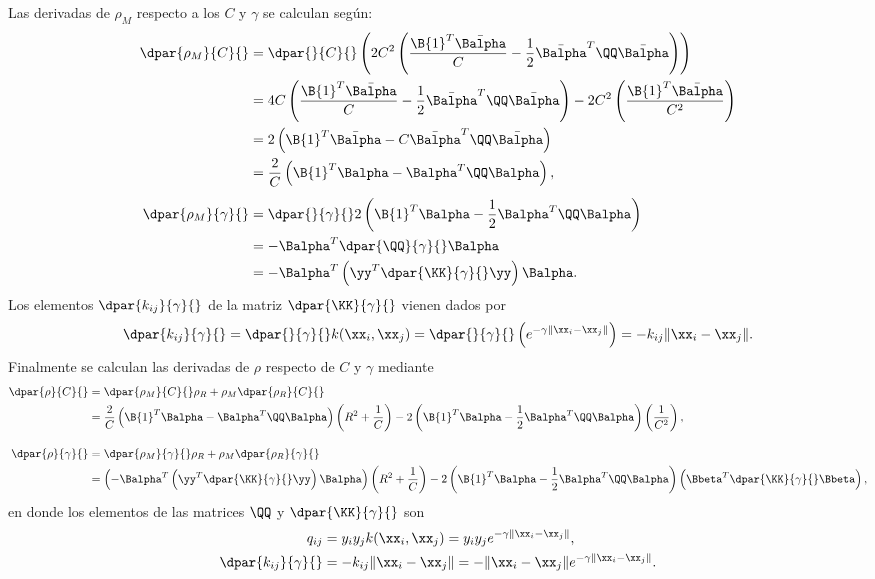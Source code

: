 Las derivadas de $\rho_M$ respecto a los  $C$ y $\gamma$ se
calculan según:
%
\begin{align}
    \dpar{\rho_M}{C}{}
    &= \dpar{}{C}{}\left( 2C^2\left(\frac{\B{1}^T\bar{\Balpha}}{C} -
    \frac{1}{2}\bar{\Balpha}^T\QQ\bar{\Balpha}\right)
    \right) \nonumber\\
    &= 4C \left(\frac{\B{1}^T\bar{\Balpha}}{C} -
    \frac{1}{2}\bar{\Balpha}^T\QQ\bar{\Balpha}\right)
    - 2C^2 \left(\frac{\B{1}^T\bar{\Balpha}}{C^2} \right) \nonumber\\
    &= 2\left(\B{1}^T\bar{\Balpha}
    - C \bar{\Balpha}^T\QQ\bar{\Balpha}\right) \nonumber\\
    &= \frac{2}{C} \left(\B{1}^T\Balpha - \Balpha^T\QQ\Balpha\right),\\[1ex]
    \dpar{\rho_M}{\gamma}{}
    &= \dpar{}{\gamma}{}
    2\left(  \B{1}^T\Balpha-\frac{1}{2}\Balpha^T\QQ\Balpha \right) \nonumber\\
    &= - \Balpha^T \dpar{\QQ}{\gamma}{}\Balpha \nonumber\\
    & = - \Balpha^T \left(\yy^T \dpar{\KK}{\gamma}{}\yy\right) \Balpha.
\end{align}
%
Los elementos $\dpar{k_{ij}}{\gamma}{}$ de la matriz
$\dpar{\KK}{\gamma}{}$ vienen dados por
%
\begin{align}
  \dpar{k_{ij}}{\gamma}{}
  = \dpar{}{\gamma}{}k(\xx_i,\xx_j)
  = \dpar{}{\gamma}{} \left(e^{-\gamma\|\xx_i-\xx_j\|}\right)
  = -k_{ij}\|\xx_i-\xx_j\|.
\end{align}
%
Finalmente se calculan las derivadas de $\rho$ respecto de $C$ y
$\gamma$ mediante
%
\begin{align}
    \dpar{\rho}{C}{} &= \dpar{\rho_M}{C}{} \rho_R + \rho_M \dpar{\rho_R}{C}{} \nonumber\\
    &= \frac{2}{C} \left(\B{1}^T\Balpha - \Balpha^T\QQ\Balpha\right) \left( R^2 + \frac{1}{C} \right)
    - 2\left(  \B{1}^T\Balpha-\frac{1}{2}\Balpha^T\QQ\Balpha \right)
    \left( \frac{1}{C^2} \right) \label{drho-dc}, \\[1em]
    \dpar{\rho}{\gamma}{} &= \dpar{\rho_M}{\gamma}{} \rho_R + \rho_M \dpar{\rho_R}{\gamma}{}\nonumber\\
    &= \left( - \Balpha^T \left(\yy^T \dpar{\KK}{\gamma}{}\yy\right) \Balpha \right)
    \left( R^2 + \frac{1}{C} \right)
    - 2\left(  \B{1}^T\Balpha-\frac{1}{2}\Balpha^T\QQ\Balpha \right)
    \left( \Bbeta^T \dpar{\KK}{\gamma}{} \Bbeta \right), \label{drho-dgamma}
\end{align}
%
en donde los elementos de las matrices $\QQ$ y $\dpar{\KK}{\gamma}{}$
son
%
\begin{align}
  q_{ij}&=y_i y_j k(\xx_i,\xx_j)= y_i y_j e^{-\gamma\|\xx_i-\xx_j\|}, \\
  \dpar{k_{ij}}{\gamma}{}&=-k_{ij}\|\xx_i-\xx_j\| = -\|\xx_i-\xx_j\|e^{-\gamma\|\xx_i-\xx_j\|}.
\end{align}
%
